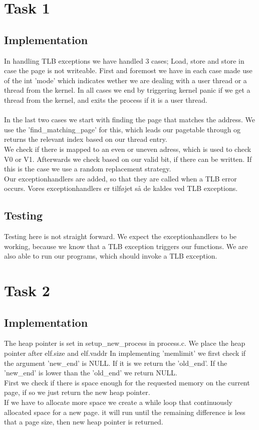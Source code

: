 \documentclass[12pt]{article}
\begin{document}
\section*{Task 1}
\subsection*{Implementation}
In handling TLB exceptions we have handled 3 cases; Load, store and store in case the page is not writeable. First and foremost we have in each case made use of the int 'mode' which indicates wether we are dealing with a user thread or a thread from the kernel. In all cases we end by triggering kernel panic if we get a thread from the kernel, and exits the process if it is a user thread.\\\\
In the last two cases we start with finding the page that matches the address. We use the 'find\_matching\_page' for this, which leads our pagetable through og returns the relevant index based on our thread entry.\\
We check if there is mapped to an even or uneven adress, which is used to check V0 or V1. Afterwards we check based on our valid bit, if there can be written. If this is the case we use a random replacement strategy.\\
Our exceptionhandlers are added, so that they are called when a TLB error occurs.
Vores exceptionhandlers er tilføjet så de kaldes ved TLB exceptions.

\subsection*{Testing}
Testing here is not straight forward. We expect the exceptionhandlers to be working, because we know that a TLB exception triggers our functions. We are also able to run our programs, which should invoke a TLB exception.

\section*{Task 2}
\subsection*{Implementation}
The heap pointer is set in setup\_new\_process in process.c. We place the heap pointer after elf.size and elf.vaddr
In implementing 'memlimit' we first check if the argument 'new\_end' is NULL. If it is we return the 'old\_end'. If the 'new\_end' is lower than the 'old\_end' we return NULL. \\
First we check if there is space enough for the requested memory on the current page, if so we just return the new heap pointer.\\
If we have to allocate more space we create a while loop that continuously allocated space for a new page. it will run until the remaining difference is less that a page size, then new heap pointer is returned.
\end{document}
